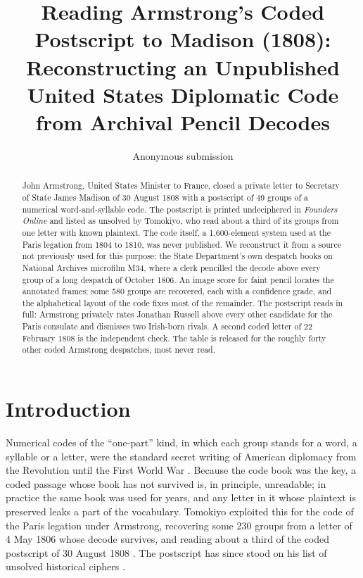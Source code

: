 \documentclass[11pt]{article}
\title{Reading Armstrong's Coded Postscript to Madison (1808): \\ Reconstructing an Unpublished United States Diplomatic Code from Archival Pencil Decodes}
\author{Anonymous submission}
\date{}
\begin{document}
\maketitle

\begin{abstract}
John Armstrong, United States Minister to France, closed a private letter to Secretary of State James Madison of 30 August 1808 with a postscript of 49 groups of a numerical word-and-syllable code. The postscript is printed undeciphered in \emph{Founders Online} and listed as unsolved by Tomokiyo, who read about a third of its groups from one letter with known plaintext. The code itself, a 1,600-element system used at the Paris legation from 1804 to 1810, was never published. We reconstruct it from a source not previously used for this purpose: the State Department's own despatch books on National Archives microfilm M34, where a clerk pencilled the decode above every group of a long despatch of October 1806. An image score for faint pencil locates the annotated frames; some 580 groups are recovered, each with a confidence grade, and the alphabetical layout of the code fixes most of the remainder. The postscript reads in full: Armstrong privately rates Jonathan Russell above every other candidate for the Paris consulate and dismisses two Irish-born rivals. A second coded letter of 22 February 1808 is the independent check. The table is released for the roughly forty other coded Armstrong despatches, most never read.
\end{abstract}

\section{Introduction}

Numerical codes of the ``one-part'' kind, in which each group stands for a word, a syllable or a letter, were the standard secret writing of American diplomacy from the Revolution until the First World War \cite{Weber:1979}. Because the code book was the key, a coded passage whose book has not survived is, in principle, unreadable; in practice the same book was used for years, and any letter in it whose plaintext is preserved leaks a part of the vocabulary. Tomokiyo exploited this for the code of the Paris legation under Armstrong, recovering some 230 groups from a letter of 4 May 1806 whose decode survives, and reading about a third of the coded postscript of 30 August 1808 \cite{Tomokiyo:armstrong}. The postscript has since stood on his list of unsolved historical ciphers \cite{Tomokiyo:unsolved}.
\end{document}

